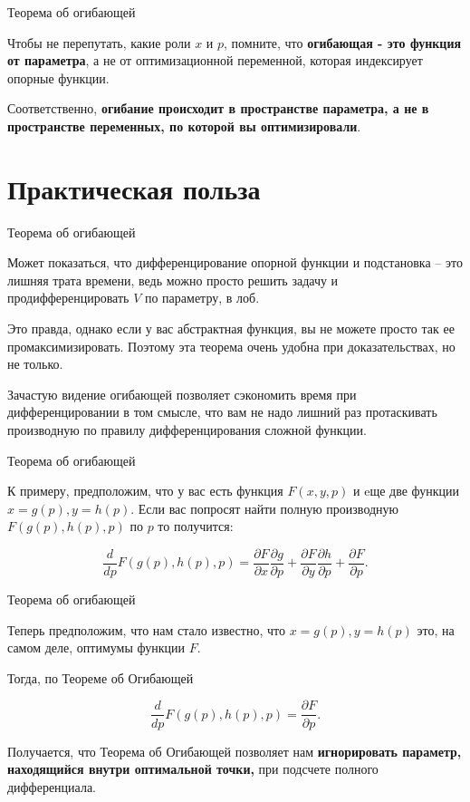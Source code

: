 \documentclass{beamer}
\begin{document}
\begin{frame}{Теорема об огибающей}

Чтобы не перепутать, какие роли $x$ и $p$, помните, что \textbf{огибающая - это функция от параметра}, а не от оптимизационной переменной, которая индексирует опорные функции. 

Соответственно, \textbf{огибание происходит в пространстве параметра, а не в пространстве переменных, по которой вы оптимизировали}.

\end{frame}

\section{Практическая польза}

\begin{frame}{Теорема об огибающей}

Может показаться, что дифференцирование опорной функции и подстановка – это лишняя трата времени, ведь можно просто решить задачу и продифференцировать $V$ по параметру, в лоб.

Это правда, однако если у вас абстрактная функция, вы не можете просто так ее промаксимизировать. Поэтому эта теорема очень удобна при доказательствах, но не только. 

Зачастую видение огибающей позволяет сэкономить время при дифференцировании в том смысле, что вам не надо лишний раз протаскивать производную по правилу дифференцирования сложной функции.

\end{frame}

\begin{frame}{Теорема об огибающей}

К примеру, предположим, что у вас есть функция $F(x, y, p)$ и eще две функции $x = g(p), y = h(p)$. Если вас попросят найти полную производную $F(g(p), h(p), p)$ по $p$ то получится:

$$\frac{d}{dp} F(g(p), h(p), p) = \frac{\partial F}{\partial x} \frac{\partial g}{\partial p} + \frac{\partial F}{\partial y} \frac{\partial h}{\partial p} + \frac{\partial F}{\partial p}.$$

\end{frame}

\begin{frame}{Теорема об огибающей}

Теперь предположим, что нам стало известно, что $x = g(p), y = h(p)$ это, на самом деле, оптимумы функции $F$. 

Тогда, по Теореме об Огибающей

$$\frac{d}{dp} F(g(p), h(p), p) = \frac{\partial F}{\partial p}.$$

Получается, что Теорема об Огибающей позволяет нам \textbf{игнорировать параметр, находящийся внутри оптимальной точки,} при подсчете полного дифференциала.

\end{frame}
\end{document}
